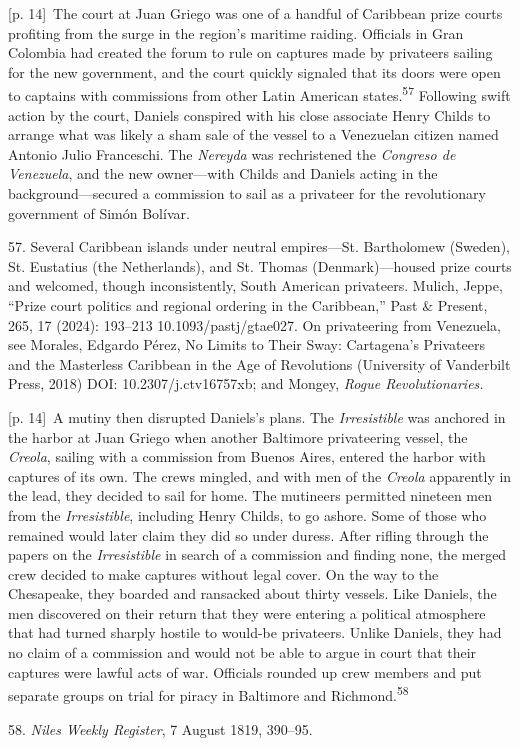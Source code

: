 \documentclass[10pt,a4paper]{article}
\begin{document}
{\scriptsize\color{gray} [p. 14]}\ The court at Juan Griego was one of a handful of Caribbean prize courts profiting from the surge in the region’s maritime raiding. Officials in Gran Colombia had created the forum to rule on captures made by privateers sailing for the new government, and the court quickly signaled that its doors were open to captains with commissions from other Latin American states.\nobreak\textsuperscript{57} Following swift action by the court, Daniels conspired with his close associate Henry Childs to arrange what was likely a sham sale of the vessel to a Venezuelan citizen named Antonio Julio Franceschi. The \textit{Nereyda} was rechristened the \textit{Congreso de Venezuela}, and the new owner—with Childs and Daniels acting in the background—secured a commission to sail as a privateer for the revolutionary government of Simón Bolívar.\par{\small 57. Several Caribbean islands under neutral empires—St. Bartholomew (Sweden), St. Eustatius (the Netherlands), and St. Thomas (Denmark)—housed prize courts and welcomed, though inconsistently, South American privateers. Mulich, Jeppe, “Prize court politics and regional ordering in the Caribbean,” Past \& Present, 265, 17 (2024): 193–213 10.1093/pastj/gtae027. On privateering from Venezuela, see Morales, Edgardo Pérez, No Limits to Their Sway: Cartagena’s Privateers and the Masterless Caribbean in the Age of Revolutions (University of Vanderbilt Press, 2018) DOI: 10.2307/j.ctv16757xb; and Mongey, \textit{Rogue Revolutionaries.}\par}
{\scriptsize\color{gray} [p. 14]}\ A mutiny then disrupted Daniels’s plans. The \textit{Irresistible} was anchored in the harbor at Juan Griego when another Baltimore privateering vessel, the \textit{Creola}, sailing with a commission from Buenos Aires, entered the harbor with captures of its own. The crews mingled, and with men of the \textit{Creola} apparently in the lead, they decided to sail for home. The mutineers permitted nineteen men from the \textit{Irresistible}, including Henry Childs, to go ashore. Some of those who remained would later claim they did so under duress. After rifling through the papers on the \textit{Irresistible} in search of a commission and finding none, the merged crew decided to make captures without legal cover. On the way to the Chesapeake, they boarded and ransacked about thirty vessels. Like Daniels, the men discovered on their return that they were entering a political atmosphere that had turned sharply hostile to would-be privateers. Unlike Daniels, they had no claim of a commission and would not be able to argue in court that their captures were lawful acts of war. Officials rounded up crew members and put separate groups on trial for piracy in Baltimore and Richmond.\nobreak\textsuperscript{58}\par{\small 58. \textit{Niles Weekly Register}, 7 August 1819, 390–95.\par}
\end{document}
